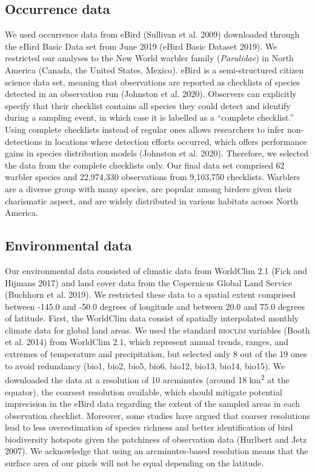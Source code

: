 \documentclass[11pt]{article}
\begin{document}
\hypertarget{occurrence-data}{%
\subsection{Occurrence data}\label{occurrence-data}}

We used occurrence data from eBird (Sullivan et al. 2009) downloaded
through the eBird Basic Data set from June 2019 (eBird Basic Dataset
2019). We restricted our analyses to the New World warbler family
(\emph{Parulidae}) in North America (Canada, the United States, Mexico).
eBird is a semi-structured citizen science data set, meaning that
observations are reported as checklists of species detected in an
observation run (Johnston et al. 2020). Observers can explicitly specify
that their checklist contains all species they could detect and identify
during a sampling event, in which case it is labelled as a ``complete
checklist.'' Using complete checklists instead of regular ones allows
researchers to infer non-detections in locations where detection efforts
occurred, which offers performance gains in species distribution models
(Johnston et al. 2020). Therefore, we selected the data from the
complete checklists only. Our final data set comprised 62 warbler
species and 22,974,330 observations from 9,103,750 checklists. Warblers
are a diverse group with many species, are popular among birders given
their charismatic aspect, and are widely distributed in various habitats
across North America.

\hypertarget{environmental-data}{%
\subsection{Environmental data}\label{environmental-data}}

Our environmental data consisted of climatic data from WorldClim 2.1
(Fick and Hijmans 2017) and land cover data from the Copernicus Global
Land Service (Buchhorn et al. 2019). We restricted these data to a
spatial extent comprised between -145.0 and -50.0 degrees of longitude
and between 20.0 and 75.0 degrees of latitude. First, the WorldClim data
consist of spatially interpolated monthly climate data for global land
areas. We used the standard \textsc{bioclim} variables (Booth et al.
2014) from WorldClim 2.1, which represent annual trends, ranges, and
extremes of temperature and precipitation, but selected only 8 out of
the 19 ones to avoid redundancy (bio1, bio2, bio5, bio6, bio12, bio13,
bio14, bio15). We downloaded the data at a resolution of 10 arcminutes
(around 18 km\textsuperscript{2} at the equator), the coarsest
resolution available, which should mitigate potential imprecision in the
eBird data regarding the extent of the sampled areas in each observation
checklist. Moreover, some studies have argued that coarser resolutions
lead to less overestimation of species richness and better
identification of bird biodiversity hotspots given the patchiness of
observation data (Hurlbert and Jetz 2007). We acknowledge that using an
arcminutes-based resolution means that the surface area of our pixels
will not be equal depending on the latitude.
\end{document}
